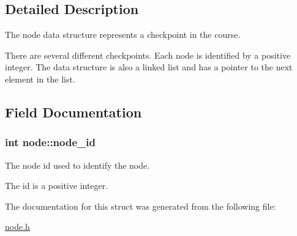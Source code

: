 \subsection{Detailed Description}
The node data structure represents a checkpoint in the course. 

There are several different checkpoints. Each node is identified by a positive integer. The data structure is also a linked list and has a pointer to the next element in the list. 

\subsection{Field Documentation}
\hypertarget{structnode_a805c6a03966d787e0ad1a877f6c0dd8c}{
\subsubsection[{node\-\_\-id}]{\setlength{\rightskip}{0pt plus 5cm}int node\-::node\-\_\-id}}\label{structnode_a805c6a03966d787e0ad1a877f6c0dd8c}


The node id used to identify the node. 

The id is a positive integer. 

The documentation for this struct was generated from the following file\-:\begin{DoxyCompactItemize}
\item 
\hyperlink{node_8h}{node.\-h}\end{DoxyCompactItemize}
